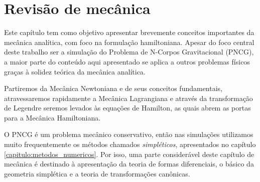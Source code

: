 \chapter{Revisão de mecânica}\label{capitulo:revisao_mecanica}

Este capítulo tem como objetivo apresentar brevemente conceitos importantes da mecânica analítica, com foco na formulação hamiltoniana. Apesar do foco central deste trabalho ser a simulação do Problema de N-Corpos Gravitacional (PNCG), a maior parte do conteúdo aqui apresentado se aplica a outros problemas físicos graças à solidez teórica da mecânica analítica.

Partiremos da Mecânica Newtoniana e de seus conceitos fundamentais, atravessaremos rapidamente a Mecânica Lagrangiana e através da transformação de Legendre seremos levados às equações de Hamilton, as quais abrem as portas para a Mecânica Hamiltoniana.

O PNCG é um problema mecânico conservativo, então nas simulações utilizamos muito frequentemente os métodos chamados \textit{simpléticos}, apresentados no capítulo \ref{capitulo:metodos_numericos}. Por isso, uma parte considerável deste capítulo de mecânica é destinado à apresentação da teoria de formas diferenciais, o básico da geometria simplética e a teoria de transformações canônicas.



% 

% 

% 

% 

